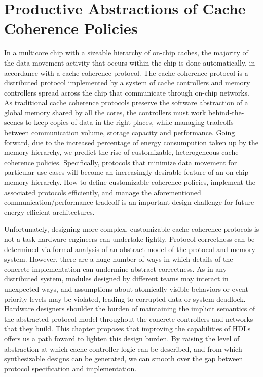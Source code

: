 \chapter{Productive Abstractions of Cache Coherence Policies}
\label{c.coherence}

In a multicore chip with a sizeable hierarchy of on-chip caches,
the majority of the data movement activity that occurs within the chip
is done automatically, in accordance with a cache coherence protocol.
The cache coherence protocol is a distributed protocol implemented by a system of cache controllers and memory controllers
spread across the chip that communicate through on-chip networks.
As traditional cache coherence protocols preserve the software abstraction of a global memory shared by all the cores,
the controllers must work behind-the-scenes to keep copies of data in the right places,
while managing tradeoffs between communication volume, storage capacity and performance.
Going forward, due to the increased percentage of energy consumpution taken up by the memory hierarchy,
we predict the rise of customizable, heterogeneous cache coherence policies.
Specifically, protocols that minimize data movement for particular use cases
will become an increasingly desirable feature of an on-chip memory hierarchy.
How to define customizable coherence policies, implement the associated protocols efficiently,
and manage the aforementioned communication/performance tradeoff is an important design challenge for future energy-efficient architectures. 

Unfortunately, designing more complex, customizable cache coherence protocols is not a task hardware engineers can undertake lightly.
Protocol correctness can be determined via formal analysis of an abstract model of the protocol and memory system.
However, there are a huge number of ways in which details of the concrete implementation can undermine abstract correctness.
As in any distributed system, modules designed by different teams may interact in unexpected ways,
and assumptions about atomically visible behaviors or event priority levels may be violated,
leading to corrupted data or system deadlock.
Hardware designers shoulder the burden of maintaining the implicit semantics of the abstracted protocol model
throughout the concrete controllers and networks that they build.
This chapter proposes that improving the capabilities of HDLs offers us a path foward to lighten this design burden.
By raising the level of abstraction at which cache controller logic can be described,
and from which synthesizable designs can be generated,
we can smooth over the gap between protocol specification and implementation.

